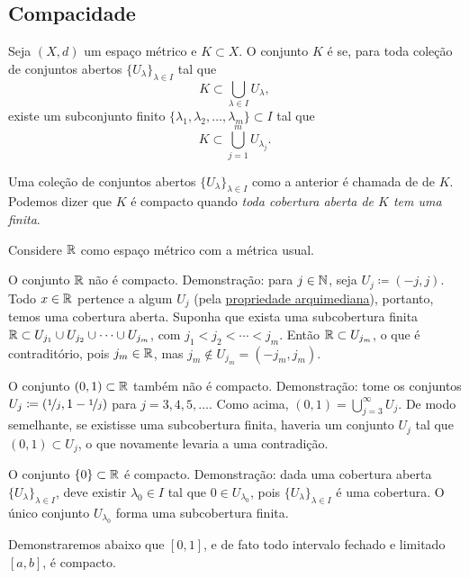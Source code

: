 \subsection{Compacidade}

\begin{defn}
Seja $(X,d)$ um espaço métrico e $K \subset X$. 
O conjunto $K$ é \emph{}
se, para toda coleção
de conjuntos abertos $\{ U_{\lambda} \}_{\lambda \in I}$ tal que
\begin{equation*}
K \subset \bigcup_{\lambda \in I} U_\lambda ,
\end{equation*}
existe um subconjunto finito
$\{ \lambda_1, \lambda_2,\ldots,\lambda_m \} \subset I$
tal que
\begin{equation*}
K \subset \bigcup_{j=1}^m U_{\lambda_j} .
\end{equation*}
\end{defn}

Uma coleção de conjuntos abertos $\{ U_{\lambda} \}_{\lambda \in I}$ como
a anterior é chamada de \emph{} de $K$.
Podemos dizer que $K$ é compacto quando \emph{toda cobertura aberta de $K$
tem uma  finita}.

\begin{example}
Considere ${\mathbb{R}}$ como espaço métrico com a métrica usual.

O conjunto ${\mathbb{R}}$ não é compacto. Demonstração: para $j \in {\mathbb{N}}$, seja
$U_j \coloneqq (-j,j)$.
Todo $x \in {\mathbb{R}}$ pertence a algum $U_j$ (pela
\hyperref[thm:arch:i]{propriedade arquimediana}), portanto, temos uma
cobertura aberta.
Suponha que exista uma subcobertura finita
${\mathbb{R}} \subset U_{j_1} \cup U_{j_2} \cup \cdots \cup U_{j_m}$,
com $j_1 < j_2 < \cdots < j_m$. Então ${\mathbb{R}} \subset U_{j_m}$, o que é
contraditório, pois $j_m \in {\mathbb{R}}$, mas $j_m \notin U_{j_m} =
(-j_m,j_m)$.

O conjunto $(0,1) \subset {\mathbb{R}}$ também não é compacto. Demonstração: tome os
conjuntos $U_{j} \coloneqq (\nicefrac{1}{j},1-\nicefrac{1}{j})$ para
$j=3,4,5,\ldots$.
Como acima, $(0,1) = \bigcup_{j=3}^\infty U_j$. De modo semelhante, se
existisse uma subcobertura finita, haveria um conjunto $U_j$ tal que
$(0,1) \subset U_j$, o que novamente levaria a uma contradição.

O conjunto $\{ 0 \} \subset {\mathbb{R}}$ é compacto. Demonstração: dada uma cobertura
aberta $\{ U_{\lambda} \}_{\lambda \in I}$, deve existir $\lambda_0 \in I$
tal que $0 \in U_{\lambda_0}$, pois $\{ U_{\lambda} \}_{\lambda \in I}$ é uma
cobertura.
O único conjunto $U_{\lambda_0}$ forma uma subcobertura finita.

Demonstraremos abaixo que $[0,1]$, e de fato todo intervalo fechado e
limitado $[a,b]$, é compacto.
\end{example}

